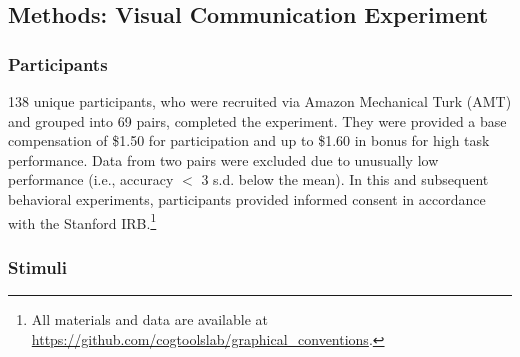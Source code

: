 \documentclass[10pt,letterpaper]{article}
\begin{document}

\subsection{Methods: Visual Communication Experiment}

\subsubsection{Participants} 138 unique participants, who were recruited via Amazon Mechanical Turk (AMT) and grouped into 69 pairs, completed the experiment.
They were provided a base compensation of \$1.50 for participation and up to \$1.60 in bonus for high task performance.
Data from two pairs were excluded due to unusually low performance (i.e., accuracy $<$ 3 s.d. below the mean).
In this and subsequent behavioral experiments, participants provided informed consent in accordance with the Stanford IRB.\footnote{All materials and data are available at \url{https://github.com/cogtoolslab/graphical_conventions}.}

\subsubsection{Stimuli} 
\end{document}
